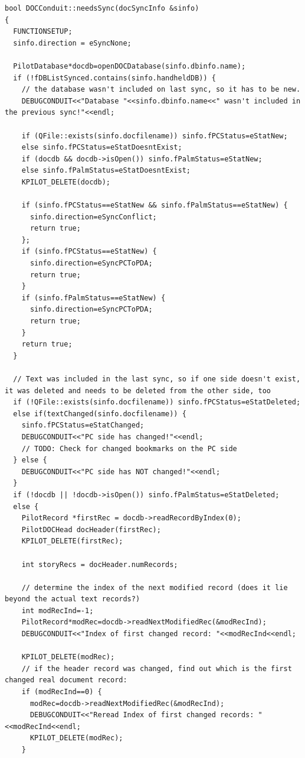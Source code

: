\documentclass[10pt,a4paper]{article}
\begin{document}
{\footnotesize
\begin{verbatim}
bool DOCConduit::needsSync(docSyncInfo &sinfo)
{
  FUNCTIONSETUP;
  sinfo.direction = eSyncNone;
  
  PilotDatabase*docdb=openDOCDatabase(sinfo.dbinfo.name);
  if (!fDBListSynced.contains(sinfo.handheldDB)) {
    // the database wasn't included on last sync, so it has to be new.
    DEBUGCONDUIT<<"Database "<<sinfo.dbinfo.name<<" wasn't included in the previous sync!"<<endl;

    if (QFile::exists(sinfo.docfilename)) sinfo.fPCStatus=eStatNew;
    else sinfo.fPCStatus=eStatDoesntExist;
    if (docdb && docdb->isOpen()) sinfo.fPalmStatus=eStatNew;
    else sinfo.fPalmStatus=eStatDoesntExist;
    KPILOT_DELETE(docdb);
    
    if (sinfo.fPCStatus==eStatNew && sinfo.fPalmStatus==eStatNew) {
      sinfo.direction=eSyncConflict;
      return true;
    };
    if (sinfo.fPCStatus==eStatNew) {
      sinfo.direction=eSyncPCToPDA;
      return true;
    }
    if (sinfo.fPalmStatus==eStatNew) {
      sinfo.direction=eSyncPCToPDA;
      return true;
    }
    return true;
  }
  
  // Text was included in the last sync, so if one side doesn't exist, it was deleted and needs to be deleted from the other side, too
  if (!QFile::exists(sinfo.docfilename)) sinfo.fPCStatus=eStatDeleted;
  else if(textChanged(sinfo.docfilename)) {
    sinfo.fPCStatus=eStatChanged;
    DEBUGCONDUIT<<"PC side has changed!"<<endl;
    // TODO: Check for changed bookmarks on the PC side
  } else {
    DEBUGCONDUIT<<"PC side has NOT changed!"<<endl;
  }
  if (!docdb || !docdb->isOpen()) sinfo.fPalmStatus=eStatDeleted;
  else {
    PilotRecord *firstRec = docdb->readRecordByIndex(0);
    PilotDOCHead docHeader(firstRec);
    KPILOT_DELETE(firstRec);

    int storyRecs = docHeader.numRecords;

    // determine the index of the next modified record (does it lie beyond the actual text records?)
    int modRecInd=-1;
    PilotRecord*modRec=docdb->readNextModifiedRec(&modRecInd);
    DEBUGCONDUIT<<"Index of first changed record: "<<modRecInd<<endl;
    
    KPILOT_DELETE(modRec);
    // if the header record was changed, find out which is the first changed real document record:
    if (modRecInd==0) {
      modRec=docdb->readNextModifiedRec(&modRecInd);
      DEBUGCONDUIT<<"Reread Index of first changed records: "<<modRecInd<<endl;
      KPILOT_DELETE(modRec);
    }
  

\end{verbatim}}
\end{document}
